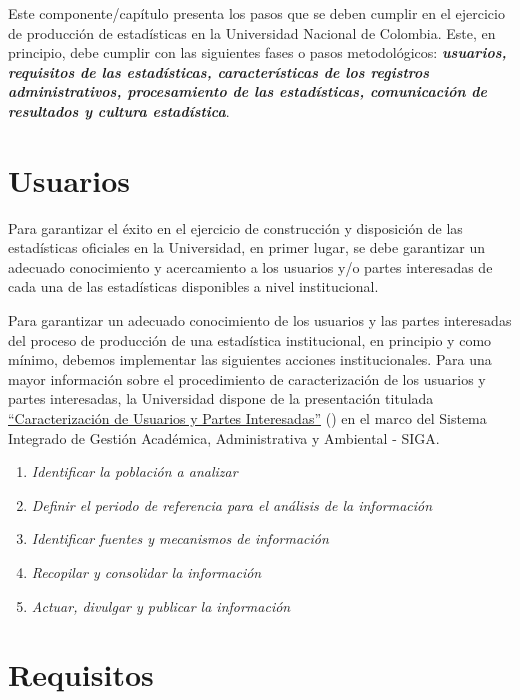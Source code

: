 \documentclass[
]{book}
\providecommand{\tightlist}{%
  \setlength{\itemsep}{0pt}\setlength{\parskip}{0pt}}
\begin{document}
Este componente/capítulo presenta los pasos que se deben cumplir en el ejercicio de producción de estadísticas en la Universidad Nacional de Colombia. Este, en principio, debe cumplir con las siguientes fases o pasos metodológicos: \textbf{\emph{usuarios, requisitos de las estadísticas, características de los registros administrativos, procesamiento de las estadísticas, comunicación de resultados y cultura estadística}}.

\hypertarget{usuarios}{%
\section{Usuarios}\label{usuarios}}

Para garantizar el éxito en el ejercicio de construcción y disposición de las estadísticas oficiales en la Universidad, en primer lugar, se debe garantizar un adecuado conocimiento y acercamiento a los usuarios y/o partes interesadas de cada una de las estadísticas disponibles a nivel institucional.

Para garantizar un adecuado conocimiento de los usuarios y las partes interesadas del proceso de producción de una estadística institucional, en principio y como mínimo, debemos implementar las siguientes acciones institucionales. Para una mayor información sobre el procedimiento de caracterización de los usuarios y partes interesadas, la Universidad dispone de la presentación titulada \href{http://siga.unal.edu.co/images/Modulos/Ova/Caracterizacin-de-usuarios-y-partes-interesadas.pdf}{``Caracterización de Usuarios y Partes Interesadas''} (\citet{siga2021}) en el marco del Sistema Integrado de Gestión Académica, Administrativa y Ambiental - SIGA.

\begin{enumerate}
\def\labelenumi{\arabic{enumi}.}
\tightlist
\item
  \emph{Identificar la población a analizar}
\item
  \emph{Definir el periodo de referencia para el análisis de la información}
\item
  \emph{Identificar fuentes y mecanismos de información}
\item
  \emph{Recopilar y consolidar la información}
\item
  \emph{Actuar, divulgar y publicar la información}
\end{enumerate}

\hypertarget{requisitos}{%
\section{Requisitos}\label{requisitos}}
\end{document}
